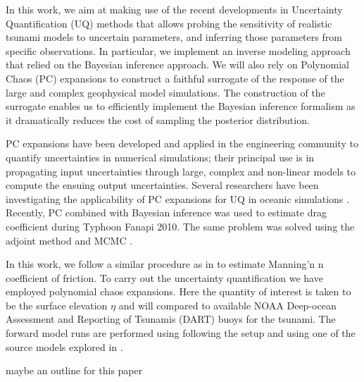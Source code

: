 In this work, we aim at making use of the recent developments in Uncertainty Quantification 
(UQ) methods that allows probing the sensitivity of realistic tsunami models 
to uncertain parameters, and inferring those parameters from specific observations. 
In particular, we implement an inverse modeling approach that relied on the Bayesian inference approach.  
We will also rely on Polynomial Chaos (PC) expansions to construct a 
faithful surrogate of the response of the large and complex geophysical 
model simulations.  The construction of the surrogate enables us to efficiently 
implement the Bayesian inference formalism as it dramatically reduces the cost of 
sampling the posterior distribution. 

PC expansions have been developed and applied in the engineering community to quantify uncertainties
in numerical simulations; their principal use is in propagating input
uncertainties through large, complex and non-linear models to compute the
ensuing output uncertainties. Several researchers have been 
investigating the applicability of PC expansions for UQ in oceanic simulations
\citep{thacker2012,ashwanth2010,Alexanderian2012}. Recently,
PC combined with Bayesian inference was used to estimate drag coefficient
during Typhoon Fanapi 2010. The same problem was solved using
the adjoint method and MCMC \cite{sraj:2013a,sraj:2013b}.

In this work, we follow a similar procedure as in \cite{sraj:2013a,sraj:2013b}
to estimate Manning'n n coefficient of friction. 
To carry out the uncertainty quantification we have employed polynomial chaos expansions.  Here the quantity of interest is taken to be the surface elevation $\eta$ and will compared to available NOAA Deep-ocean Assessment and Reporting of Tsunamis (DART) buoys for the \tohoku tsunami.  The forward model runs are performed using \geoclaw following the setup and using one of the source models explored in \cite{MacInnes:2013cr}.

\alert{maybe an outline for this paper}